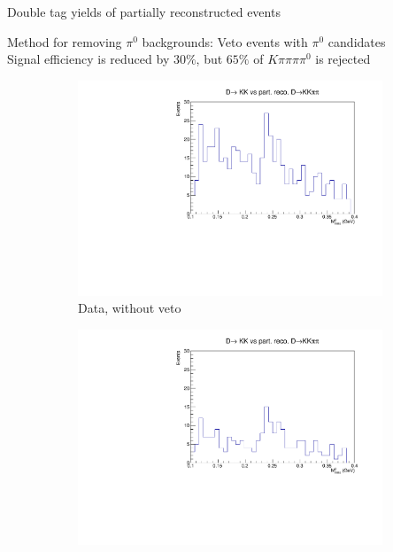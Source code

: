 \documentclass{beamer}
\begin{document}
\begin{frame}{Double tag yields of partially reconstructed events}
  \begin{center}
    Method for removing $\pi^0$ backgrounds: Veto events with $\pi^0$ candidates\\
    Signal efficiency is reduced by $30\%$, but $65\%$ of $K\pi\pi\pi\pi^0$ is rejected
  \end{center}
  \vspace{-0.2cm}
  \begin{figure}
    \centering
    \begin{subfigure}{0.32\textwidth}
      \includegraphics[width = 1.0\textwidth]{Plots/KKPartReco_Mmiss2_NoCuts.pdf}
      \caption{Data, without veto}
    \end{subfigure}%
    \begin{subfigure}{0.32\textwidth}
      \includegraphics[width = 1.0\textwidth]{Plots/KKPartReco_Mmiss2_Pi0Veto.pdf}

\end{subfigure}
\end{figure}
\end{frame}
\end{document}
